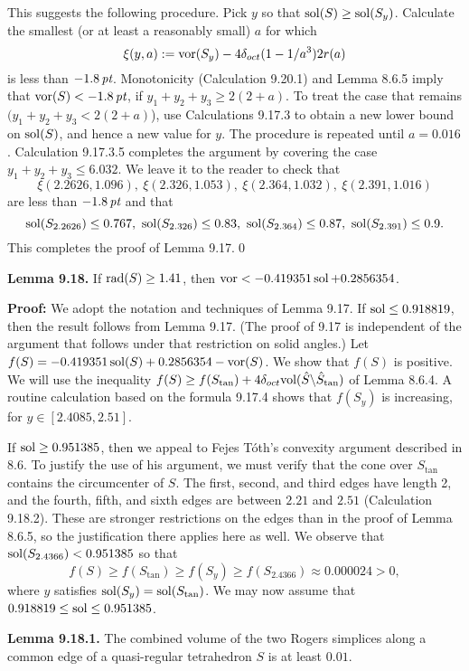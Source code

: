 This suggests the following procedure. Pick
$y$ so that  $\operatorname{sol}(S)\ge \operatorname{sol}(S_y)$.
Calculate
the smallest 
(or at least a reasonably small) $a$ for which 
$$\xi(y,a):=\operatorname{vor}(S_y)- 4\delta_{oct}
(1-1/a^3) 2r(a)$$
is less than $-1.8\,\hbox{\it pt}$.  
Monotonicity (Calculation 9.20.1) and Lemma 8.6.5 imply
that 
$\operatorname{vor}(S)<-1.8\,\hbox{\it pt}$, if $y_1+y_2+y_3\ge2(2+a)$.  
To treat the case that remains $(y_1+y_2+y_3<2(2+a)$),
use Calculations 9.17.3 to obtain a new lower bound
on $\operatorname{sol}(S)$, and hence a new value for $y$.
 The procedure is repeated until
$a = 0.016$.  
Calculation 9.17.3.5 completes the argument by
covering the case $y_1+y_2+y_3\le 6.032$.
We leave it to
the reader to check that
$$\xi(2.2626,1.096),\ \xi(2.326,1.053),\ \xi(2.364,1.032),\ 
  \xi(2.391,1.016)$$
are less than $-1.8\,\hbox{\it pt}$ and that
$$\sol(S_{2.2626})\le 0.767,\ \sol(S_{2.326})\le 0.83,\ 
\sol(S_{2.364})\le 0.87,\ \sol(S_{2.391})\le 0.9.$$
This completes the proof of Lemma 9.17.\qed

\bigskip
{\bf Lemma 9.18.}  
If
$\operatorname{rad}(S)\ge 1.41$, then
$\operatorname{vor} < -0.419351\operatorname{sol} + 0.2856354$. 

{\bf Proof:}  We adopt the notation and techniques
of Lemma 9.17.
If $\operatorname{sol}\le 0.918819$, then the result follows from Lemma 9.17.
(The proof of 9.17 is independent of the argument that follows
under that restriction on solid angles.)
Let $f(S) = -0.419351\operatorname{sol}(S) + 0.2856354-\operatorname{vor}(S)$.  We
show that $f(S)$ is positive.  We will use the inequality
$f(S)\ge f(S_{\tan})+4\delta_{oct}\hbox{vol}(\hat S\backslash \hat S_{\tan})$
of Lemma 8.6.4.  A routine calculation based on the
formula 9.17.4 shows that
$f(S_y)$ is increasing, for $y\in [2.4085,2.51]$.

If $\operatorname{sol}\ge 0.951385$, then
we appeal to Fejes T\'oth's
convexity argument described in 8.6.  To justify the use
of his argument, we must verify that the cone over $S_{\tan}$
contains the circumcenter of $S$.  The first, second, and
third edges have length 2, and the fourth, fifth, and
sixth edges are between $2.21$ and $2.51$ (Calculation 9.18.2).
These are stronger restrictions on the edges than in
the proof of Lemma 8.6.5, so the justification there applies here
as well.
We 
observe that $\operatorname{sol}(S_{2.4366})< 0.951385$ 
so that
$$f(S)\ge f(S_{\tan}) \ge f(S_y) \ge f(S_{2.4366})\approx 0.000024>0,$$
where $y$ satisfies $\operatorname{sol}(S_y)=\operatorname{sol}(S_{\tan})$.
We may now assume that $0.918819\le \operatorname{sol}\le 0.951385$.



{\bf Lemma 9.18.1.}  The combined volume of the two Rogers
simplices along a common edge of a quasi-regular tetrahedron
$S$ is at least $0.01$.

